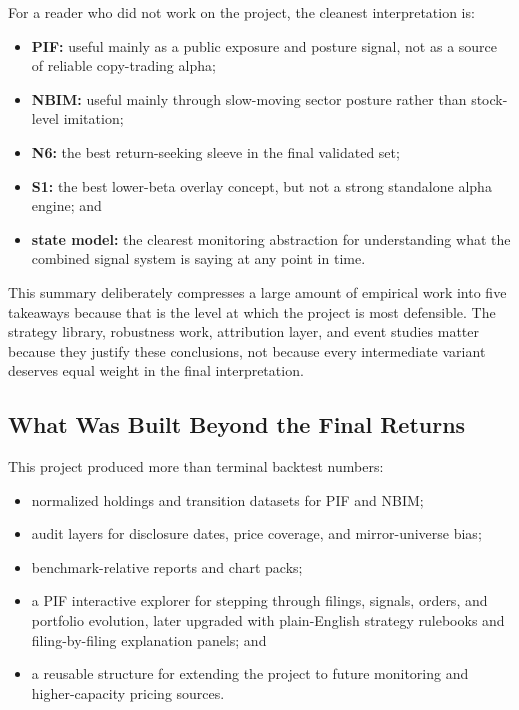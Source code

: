 \documentclass[conference]{IEEEtran}
\begin{document}
For a reader who did not work on the project, the cleanest interpretation is:
\begin{itemize}[leftmargin=1.4em]
    \item \textbf{PIF:} useful mainly as a public exposure and posture signal, not as a source of reliable copy-trading alpha;
    \item \textbf{NBIM:} useful mainly through slow-moving sector posture rather than stock-level imitation;
    \item \textbf{N6:} the best return-seeking sleeve in the final validated set;
    \item \textbf{S1:} the best lower-beta overlay concept, but not a strong standalone alpha engine; and
    \item \textbf{state model:} the clearest monitoring abstraction for understanding what the combined signal system is saying at any point in time.
\end{itemize}

This summary deliberately compresses a large amount of empirical work into five takeaways because that is the level at which the project is most defensible. The strategy library, robustness work, attribution layer, and event studies matter because they justify these conclusions, not because every intermediate variant deserves equal weight in the final interpretation.

\subsection{What Was Built Beyond the Final Returns}

This project produced more than terminal backtest numbers:
\begin{itemize}[leftmargin=1.4em]
    \item normalized holdings and transition datasets for PIF and NBIM;
    \item audit layers for disclosure dates, price coverage, and mirror-universe bias;
    \item benchmark-relative reports and chart packs;
    \item a PIF interactive explorer for stepping through filings, signals, orders, and portfolio evolution, later upgraded with plain-English strategy rulebooks and filing-by-filing explanation panels; and
    \item a reusable structure for extending the project to future monitoring and higher-capacity pricing sources.
\end{itemize}
\end{document}

